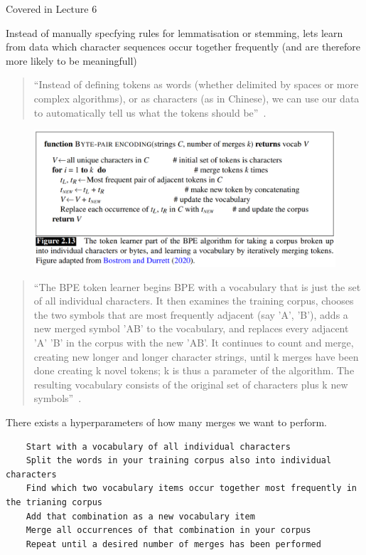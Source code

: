 \documentclass[11pt]{article}
\begin{document}
\begin{warning}
    Covered in Lecture 6
\end{warning}

Instead of manually specfying rules for lemmatisation or stemming, lets learn from data which character sequences occur together frequently (and are therefore more likely to be meaningfull)

\begin{quote}
    ``Instead of defining tokens as words (whether delimited by spaces or more complex algorithms), or as characters (as in Chinese), we can use our data to automatically tell us what the tokens should be''~\cite{book-speech-and-language-processing}.
\end{quote}

\begin{figure}[H]
    \centering
    \includegraphics[width=.8\linewidth]{figures/bpe-algorithm.png}
    \label{fig:bpe-algorithm}
\end{figure}

\begin{quote}
    ``The BPE token learner begins BPE with a vocabulary that is just the set of all individual characters. It then examines the training corpus, chooses the two symbols that are most frequently adjacent (say 'A', 'B'), adds a new merged symbol 'AB' to the vocabulary, and replaces every adjacent 'A' 'B' in the corpus with the new 'AB'. It continues to count and merge, creating new longer and longer character strings, until k merges have been done creating k novel tokens; k is thus a parameter of the algorithm. The resulting vocabulary consists of the original set of characters plus k new symbols''~\cite{book-speech-and-language-processing}.
\end{quote}

There exists a hyperparameters of how many merges we want to perform.

\begin{lstlisting}
    Start with a vocabulary of all individual characters
    Split the words in your training corpus also into individual characters
    Find which two vocabulary items occur together most frequently in the trianing corpus
    Add that combination as a new vocabulary item
    Merge all occurrences of that combination in your corpus
    Repeat until a desired number of merges has been performed
\end{lstlisting}
\end{document}
